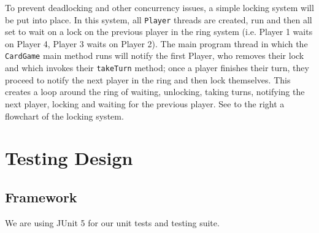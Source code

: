 \documentclass[a4paper, 11pt] {article}
\begin{document}
To prevent deadlocking and other concurrency issues, a simple locking system will be put into place. In this system, all \texttt{Player} threads are created, run and then all set to wait on a lock on the previous player in the ring system (i.e. Player 1 waits on Player 4, Player 3 waits on Player 2). The main program thread in which the \texttt{CardGame} main method runs will notify the first Player, who removes their lock and which invokes their \texttt{takeTurn} method; once a player finishes their turn, they proceed to notify the next player in the ring and then lock themselves. This creates a loop around the ring of waiting, unlocking, taking turns, notifying the next player, locking and waiting for the previous player. See to the right a flowchart of the locking system.


\pagebreak
\section*{Testing Design}
\subsection*{Framework}
We are using JUnit 5 for our unit tests and testing suite.
\end{document}
